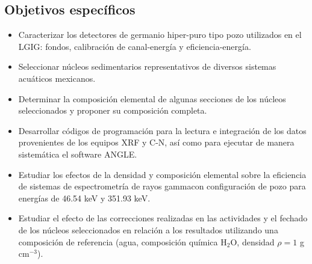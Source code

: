 	\subsection{Objetivos específicos}\label{Sec-ObjEspec}
\begin{itemize}
\item Caracterizar los detectores de germanio hiper-puro tipo pozo utilizados en el LGIG: fondos, calibración de canal-energía y eficiencia-energía.
\item Seleccionar núcleos sedimentarios representativos de diversos sistemas acuáticos mexicanos. 
\item Determinar la composición elemental de algunas secciones de los núcleos  seleccionados y proponer su composición completa. 
\item Desarrollar códigos de programación para la lectura e integración de los datos provenientes de los equipos XRF y C-N, así como para ejecutar de manera sistemática el software ANGLE.
\item Estudiar los efectos de la densidad y composición elemental sobre la eficiencia de sistemas de espectrometría de rayos gammacon configuración de pozo para energías de 46.54 keV y 351.93 keV.
\item Estudiar el efecto de las correcciones realizadas en las actividades y el fechado de los núcleos seleccionados en relación a los resultados utilizando una composición de referencia (agua, composición química H$_2$O, densidad $\rho = 1$ g cm$^{-3}$). 
\end{itemize}
